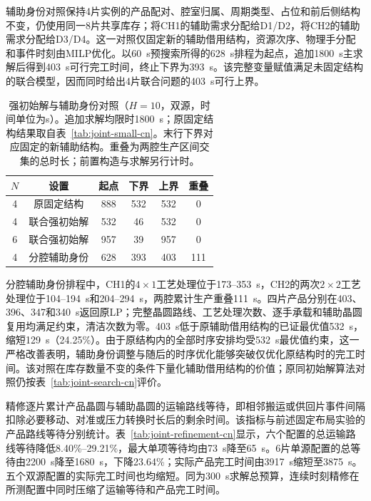 \documentclass[final,5p,times,twocolumn]{elsarticle}
\begin{document}
辅助身份对照保持4片实例的产品配对、腔室归属、周期类型、占位和前后侧结构不变，仍使用同一8片共享库存；将CH1的辅助需求分配给D1/D2，将CH2的辅助需求分配给D3/D4。这一对照仅固定新的辅助借用结构，资源次序、物理手分配和事件时刻由MILP优化。以60~s预搜索所得的628~s排程为起点，追加1800~s主求解后得到403~s可行完工时间，终止下界为393~s。该完整变量赋值满足未固定结构的联合模型，因而同时给出4片联合问题的403~s可行上界。

\begin{table}[!t]
\centering\scriptsize\setlength{\tabcolsep}{2.5pt}
\caption{强初始解与辅助身份对照（$H=10$，双源，时间单位为s）。追加求解均限时1800~s；原固定结构结果取自表~\ref{tab:joint-small-cn}。末行下界对应固定的新辅助结构。重叠为两腔生产区间交集的总时长；前置构造与求解另行计时。}
\label{tab:joint-auxiliary-cn}
\begin{tabular}{cccccc}\toprule
$N$ & 设置 & 起点 & 下界 & 上界 & 重叠\\\midrule
4 & 原固定结构 & 888 & 532 & 532 & 0\\
4 & 联合强初始解 & 532 & 46 & 532 & 0\\
6 & 联合强初始解 & 957 & 39 & 957 & 0\\
4 & 分腔辅助身份 & 628 & 393 & 403 & 111\\
\bottomrule\end{tabular}\end{table}

分腔辅助身份排程中，CH1的$4\times1$工艺处理位于173--353~s，CH2的两次$2\times2$工艺处理位于104--194~s和204--294~s，两腔累计生产重叠111~s。四片产品分别在403、396、347和340~s返回原LP；完整晶圆路线、工艺处理次数、逐手承载和辅助晶圆复用均满足约束，清洁次数为零。403~s低于原辅助借用结构的已证最优值532~s，缩短129~s（24.25\%）。由于原结构内的全部时序安排均受532~s最优值约束，这一严格改善表明，辅助身份调整与随后的时序优化能够突破仅优化原结构时的完工时间。该对照在库存数量不变的条件下量化辅助借用结构的价值；原同初始解算法对照仍按表~\ref{tab:joint-search-cn}评价。

精修逐片累计产品晶圆与辅助晶圆的运输路线等待，即相邻搬运或供回片事件间隔扣除必要移动、对准或压力转换时长后的剩余时间。该指标与前述固定布局实验的产品路线等待分别统计。表~\ref{tab:joint-refinement-cn}显示，六个配置的总运输路线等待降低8.40\%--29.21\%，最大单项等待均由73~s降至65~s。6片单源配置的总等待由2200~s降至1680~s，下降23.64\%；实际产品完工时间由3917~s缩短至3875~s。五个双源配置的实际完工时间也均缩短。同为300~s求解总预算，连续时刻精修在所测配置中同时压缩了运输等待和产品完工时间。
\end{document}
